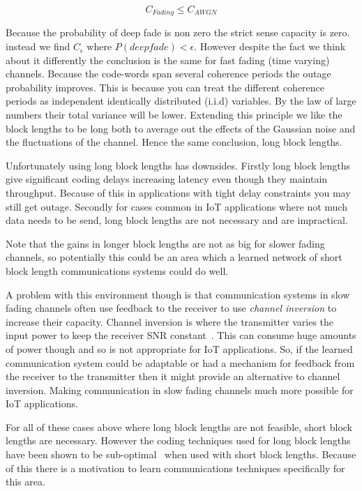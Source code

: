 \documentclass[12pt,onecolumn,letterpaper]{article}
\begin{document}
\begin{equation}
    C_{Fading} \leq C_{AWGN}
    \label{eqn:FadingVsAwgnCapacity}
\end{equation}

Because the probability of deep fade is non zero the strict sense capacity is zero. instead we find $C_{\epsilon}$ where $P(deep fade) < \epsilon$. However despite the fact we think about it differently the conclusion is the same for fast fading (time varying) channels. Because the code-words span several coherence periods the outage probability improves. This is because you can treat the different coherence periods as independent identically distributed (i.i.d) variables. By the law of large numbers their total variance will be lower. Extending this principle we like the block lengths to be long both to average out the effects of the Gaussian noise and the fluctuations of the channel. Hence the same conclusion, long block lengths.

Unfortunately using long block lengths has downsides. Firstly long block lengths give significant coding delays increasing latency even though they maintain throughput. Because of this in applications with tight delay constraints you may still get outage. Secondly for cases common in IoT applications where not much data needs to be send, long block lengths are not necessary and are impractical. 

Note that the gains in longer block lengths are not as big for slower fading channels, so potentially this could be an area which a learned network of short block length communications systems could do well.

A problem with this environment though is that communication systems in slow fading channels often use feedback to the receiver to use \textit{channel inversion} to increase their capacity. Channel inversion is where the transmitter varies the input power to keep the receiver SNR constant~\cite{WirelessTextbookC5}. This can consume huge amounts of power though and so is not appropriate for IoT applications. So, if the learned communication system could be adaptable or had a mechanism for feedback from the receiver to the transmitter then it might provide an alternative to channel inversion. Making communication in slow fading channels much more possible for IoT applications.

For all of these cases above where long block lengths are not feasible, short block lengths are necessary. However the coding techniques used for long block lengths have been shown to be sub-optimal~\cite{ShortBlockLengthNonOptimality} when used with short block lengths. Because of this there is a motivation to learn communications techniques specifically for this area.
\end{document}
